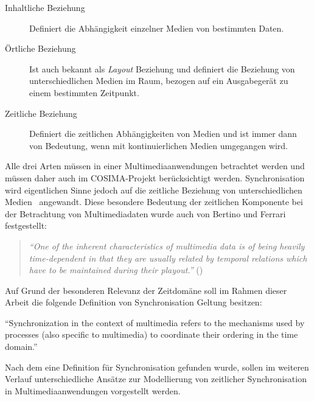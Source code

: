   \begin{description}
    \item[Inhaltliche Beziehung] Definiert die Abhängigkeit einzelner Medien von bestimmten Daten.
    \item[Örtliche Beziehung] Ist auch bekannt als \emph{Layout} Beziehung und definiert die Beziehung von unterschiedlichen Medien im Raum, bezogen auf ein Ausgabegerät zu einem bestimmten Zeitpunkt.
    \item[Zeitliche Beziehung] Definiert die zeitlichen Abhängigkeiten von Medien und ist immer dann von Bedeutung, wenn mit kontinuierlichen Medien umgegangen wird.
  \end{description}
  
  Alle drei Arten müssen in einer Multimediaanwendungen betrachtet werden und müssen daher auch im COSIMA-Projekt berücksichtigt werden. Synchronisation wird eigentlichen Sinne jedoch auf die zeitliche Beziehung von unterschiedlichen Medien~\citep[S. 572]{steinmetz1995mcc} angewandt. Diese besondere Bedeutung der zeitlichen Komponente bei der Betrachtung von Multimediadaten wurde auch von Bertino und Ferrari festgestellt:

  \begin{quote}
    \emph{"`One of the inherent characteristics of multimedia data is of being heavily time-dependent in that they are usually related by temporal relations which have to be maintained during their playout."'} (\citep[S. 612]{bertino1998tsm})
  \end{quote}
  
   Auf Grund der besonderen Relevanz der Zeitdomäne soll im Rahmen dieser Arbeit die folgende Definition von Synchronisation Geltung besitzen: 
  
  \begin{definition}[Synchronisation]\label{def:synchronisation}
    "`Synchronization in the context of multimedia refers to the mechanisms used by processes (also specific to multimedia) to coordinate their ordering in the time domain."'~\emph{\citep[S. 401]{steinmetz1990spm}}
  \end{definition}
  
  Nach dem eine Definition für Synchronisation gefunden wurde, sollen im weiteren Verlauf unterschiedliche Ansätze zur Modellierung von zeitlicher Synchronisation in Multimediaanwendungen vorgestellt werden.
  
\label{msec:modelle_zur_beschreibung_zeitlicher_synchronisation}

